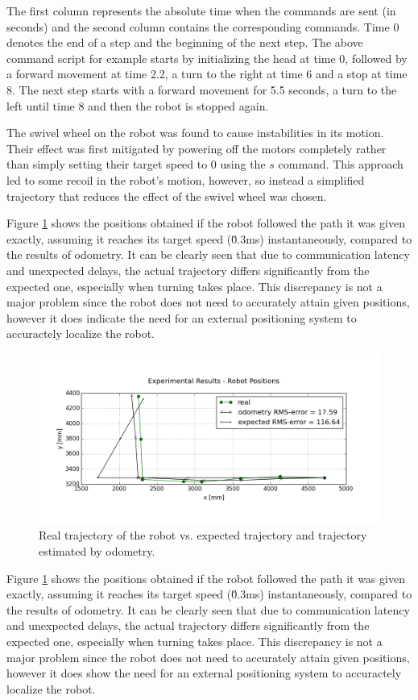 The first column represents the absolute time when the commands are sent (in seconds) and the second column contains the corresponding commands.
Time 0 denotes the end of a step and the beginning of the next step.
The above command script for example starts by initializing the head at time 0, followed by a forward movement at time 2.2, a turn to the right at time 6 and a stop at time 8.
The next step starts with a forward movement for 5.5 seconds, a turn to the left until time 8 and then the robot is stopped again.

The swivel wheel on the robot was found to cause instabilities in its motion. 
Their effect was first mitigated by powering off the motors completely rather than simply setting their target speed to 0 using the $s$ command. 
This approach led to some recoil in the robot's motion, however, so instead a simplified trajectory that reduces the effect of the swivel wheel was chosen. 

Figure \ref{fig:trajectory} shows the positions obtained if the robot followed the path it was given exactly, assuming it reaches its target speed (\u{0.3}{m\per s}) instantaneously, compared to the results of odometry. 
It can be clearly seen that due to communication latency and unexpected delays, the actual trajectory differs significantly from the expected one, especially when turning takes place. 
This discrepancy is not a major problem since the robot does not need to accurately attain given positions, however it does indicate the need for an external positioning system to accuractely localize the robot.

\begin{figure}
	\centering
	\includegraphics[width=0.8\linewidth]{files/trajectory.png} 
	\caption{Real trajectory of the robot vs. expected trajectory and trajectory estimated by odometry.}
	\label{fig:trajectory}
\end{figure}

Figure \ref{fig:trajectory} shows the positions obtained if the robot followed the path it was given exactly, assuming it reaches its target speed (\u{0.3}{m\per s}) instantaneously, compared to the results of odometry. 
It can be clearly seen that due to communication latency and unexpected delays, the actual trajectory differs significantly from the expected one, especially when turning takes place. 
This discrepancy is not a major problem since the robot does not need to accurately attain given positions, however it does show the need for an external positioning system to accuractely localize the robot.

